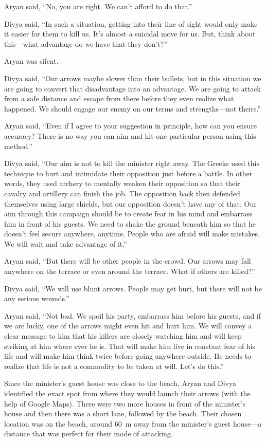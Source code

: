 Aryan said, “No, you are right. We can't afford to do that.”

Divya said, “In such a situation, getting into their line of sight would only
make it easier for them to kill us. It's almost a suicidal move for us. But,
think about this—what advantage do we have that they don't?”

Aryan was silent.

Divya said, “Our arrows maybe slower than their bullets, but in this situation
we are going to convert that disadvantage into an advantage. We are going to
attack from a safe distance and escape from there before they even realize what
happened. We should engage our enemy on our terms and strengths—not theirs.”

Aryan said, “Even if I agree to your suggestion in principle, how can you ensure
accuracy? There is no way you can aim and hit one particular person using this
method.”

Divya said, “Our aim is not to kill the minister right away. The Greeks used
this technique to hurt and intimidate their opposition just before a battle. In
other words, they used archery to mentally weaken their opposition so that their
cavalry and artillery can finish the job. The opposition back then defended
themselves using large shields, but our opposition doesn't have any of that. Our
aim through this campaign should be to create fear in his mind and embarrass him
in front of his guests. We need to shake the ground beneath him so that he
doesn't feel secure anywhere, anytime. People who are afraid will make mistakes.
We will wait and take advantage of it.”

Aryan said, “But there will be other people in the crowd. Our arrows may fall
anywhere on the terrace or even around the terrace. What if others are killed?”

Divya said, “We will use blunt arrows. People may get hurt, but there will not
be any serious wounds.”

Aryan said, “Not bad. We spoil his party, embarrass him before his guests, and
if we are lucky, one of the arrows might even hit and hurt him. We will convey a
clear message to him that his killers are closely watching him and will keep
striking at him where ever he is. That will make him live in constant fear of
his life and will make him think twice before going anywhere outside. He needs to
realize that life is not a commodity to be taken at will. Let's do this.”

Since the minister's guest house was close to the beach, Aryan and Divya
identified the exact spot from where they would launch their arrows (with the
help of Google Maps). There were two more houses in front of the minister's
house and then there was a short lane, followed by the beach. Their chosen
location was on the beach, around 60 m away from the minister's guest house—a
distance that was perfect for their mode of attacking.

